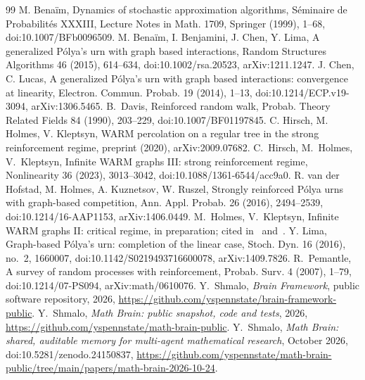 \documentclass[11pt]{amsart}
\theoremstyle{remark}\newtheorem{remark}[theorem]{Remark}
\begin{document}
\begin{thebibliography}{99}
 M. Bena\"im, Dynamics of stochastic approximation algorithms, S\'eminaire de Probabilit\'es XXXIII, Lecture Notes in Math. 1709, Springer (1999), 1--68, doi:10.1007/BFb0096509.
 M. Bena\"im, I. Benjamini, J. Chen, Y. Lima, A generalized P\'olya's urn with graph based interactions, Random Structures Algorithms 46 (2015), 614--634, doi:10.1002/rsa.20523, arXiv:1211.1247.
 J. Chen, C. Lucas, A generalized P\'olya's urn with graph based interactions: convergence at linearity, Electron. Commun. Probab. 19 (2014), 1--13, doi:10.1214/ECP.v19-3094, arXiv:1306.5465.
 B.~Davis, Reinforced random walk, Probab. Theory Related Fields 84 (1990), 203--229, doi:10.1007/BF01197845.
 C. Hirsch, M. Holmes, V. Kleptsyn, WARM percolation on a regular tree in the strong reinforcement regime, preprint (2020), arXiv:2009.07682.
 C.~Hirsch, M.~Holmes, V.~Kleptsyn, Infinite WARM graphs III: strong reinforcement regime, Nonlinearity
36 (2023), 3013--3042, doi:10.1088/1361-6544/acc9a0.
 R. van der Hofstad, M. Holmes, A. Kuznetsov, W. Ruszel, Strongly reinforced P\'olya urns with graph-based competition, Ann. Appl. Probab. 26 (2016), 2494--2539, doi:10.1214/16-AAP1153, arXiv:1406.0449.
 M.~Holmes, V.~Kleptsyn, Infinite WARM graphs II: critical regime, in preparation; cited in~\cite{HHKtree} and~\cite{HHK3}.
 Y. Lima, Graph-based P\'olya's urn: completion of the linear case, Stoch. Dyn. 16 (2016), no.~2, 1660007, doi:10.1142/S0219493716600078, arXiv:1409.7826.
 R.~Pemantle, A survey of random processes with reinforcement, Probab. Surv. 4 (2007), 1--79,
doi:10.1214/07-PS094, arXiv:math/0610076.
 Y.~Shmalo, \emph{Brain Framework}, public software repository, 2026, \url{https://github.com/yspennstate/brain-framework-public}.
 Y.~Shmalo, \emph{Math Brain: public snapshot, code and tests}, 2026, \url{https://github.com/yspennstate/math-brain-public}.
 Y.~Shmalo, \emph{Math Brain: shared, auditable memory for multi-agent mathematical research}, October 2026, doi:10.5281/zenodo.24150837, \url{https://github.com/yspennstate/math-brain-public/tree/main/papers/math-brain-2026-10-24}.
\end{thebibliography}
\end{document}
